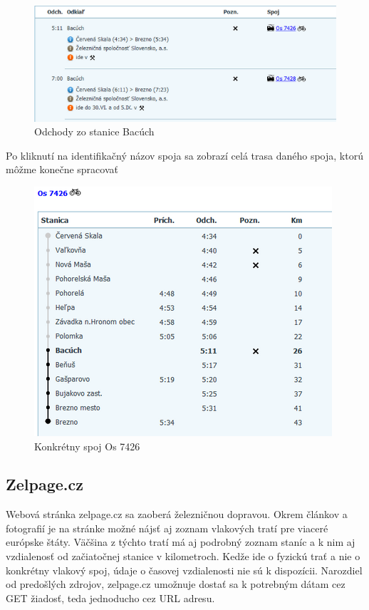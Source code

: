 \documentclass[12pt,twoside,slovak,a4paper]{article}
\begin{document}
	 \begin{figure}[H]
	 \caption{Odchody zo stanice Bacúch}
	 \includegraphics{cp_odchod_zoznam}
	 \end{figure}
	 
	 Po kliknutí na identifikačný názov spoja sa zobrazí celá trasa daného spoja, ktorú môžme konečne spracovať
	 
	 \begin{figure}[H]
	 \caption{Konkrétny spoj Os 7426}
	 \includegraphics{cp_konk_spoj}
	 \end{figure}

	\subsection{Zelpage.cz}
	Webová stránka zelpage.cz sa zaoberá železničnou dopravou. Okrem článkov a fotografií je na stránke možné nájsť aj zoznam vlakových tratí pre viaceré európske štáty. Väčšina z týchto tratí má aj podrobný zoznam staníc a k nim aj vzdialenosť od začiatočnej stanice v kilometroch. Kedže ide o fyzickú trať a nie o konkrétny vlakový spoj, údaje o časovej vzdialenosti nie sú k dispozícii. Narozdiel od predošlých zdrojov, zelpage.cz umožnuje dostať sa k potrebným dátam cez GET žiadosť, teda jednoducho cez URL adresu.
	
\end{document}
